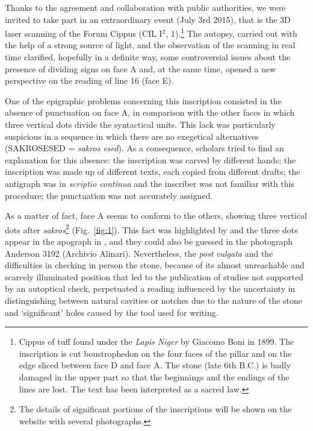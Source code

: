 \documentclass[amsthm,ebook]{saparticle}
\begin{document}
\noindent Thanks to the agreement and collaboration with public authorities, we were invited to take part in an extraordinary
event (July 3rd 2015), that is the 3D laser scanning of the Forum Cippus (CIL I$^2$, 1).\footnote{Cippus of tuff found
under the \emph{Lapis Niger} by Giacomo Boni in 1899. The inscription is cut boustrophedon on the four faces of the pillar and
on the edge sliced between face D and face A. The stone (late 6th B.C.) is badly damaged in the upper part so that the
beginnings and the endings of the lines are lost. The text has been interpreted as a sacred law.} The autopsy, carried
out with the help of a strong source of light, and the observation of the scanning in real time clarified, hopefully in
a definite way, some controversial issues about the presence of dividing signs on face A and, at the same time, opened
a new perspective on the reading of line 16 (face E). 

One of the epigraphic problems concerning this inscription consisted in the absence of punctuation on face A, in
comparison with the other faces in which three vertical dots divide the syntactical units. This lack was particularly
suspicious in a sequence in which there are no exegetical alternatives (SAKROSESED = \emph{sakros esed}). As a consequence,
scholars tried to find an explanation for this absence: the inscription was carved by different hands; the inscription
was made up of different texts, each copied from different drafts; the antigraph was in \emph{scriptio continua} and the
inscriber was not familiar with this procedure; the punctuation was not accurately assigned.

As a matter of fact, face A seems to conform to the others, showing three vertical dots after \emph{sakros}\footnote{The details of significant portions of the inscriptions will be shown on
the website with several photographs. } (Fig.~\ref{fig:1}). This fact was highlighted by \citet{gamurrini_paleografia_1899} and the three dots
appear in the apograph in \citet[col. 1003]{hulsen_neue_1899},  and they could also be guessed in the photograph Anderson 3192
(Archivio Alinari). Nevertheless, the \emph{post} \citet{goidanich_rapporti_1943} \emph{vulgata} and the difficulties in checking in person the
stone, because of its almost unreachable and scarcely illuminated position that led to the publication of studies not
supported by an autoptical check, perpetuated a reading influenced by the uncertainty in distinguishing between natural
cavities or notches due to the nature of the stone and `significant' holes caused by the tool used for writing. 
\end{document}
